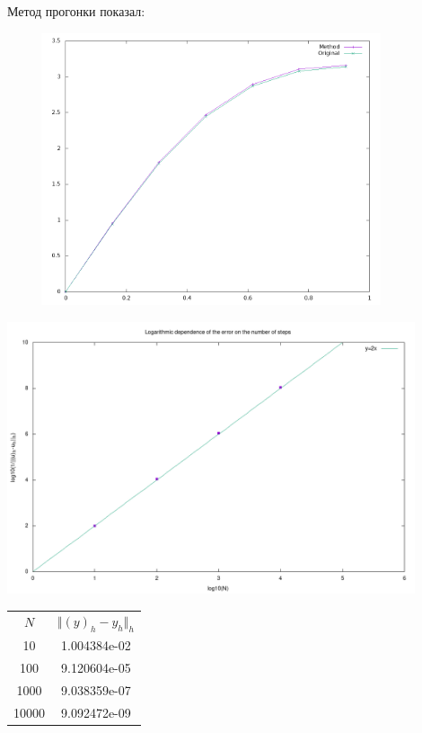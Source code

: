 \documentclass[12pt]{article}
\begin{document}
\begin{enumerate}[I.]
	      \newpage

	      Метод прогонки показал:
	      \begin{center}
		      \includegraphics[width=12cm, height=8cm]{tridiag_yn.png}

		      \includegraphics[width=12cm, height=8cm]{tridiag_scale.png}

		      \begin{tabular}{c c}
			      $N$   & $\Vert(y)_h-y_h\Vert_h$ \\
			      10    & 1.004384e-02            \\
			      100   & 9.120604e-05            \\
			      1000  & 9.038359e-07            \\
			      10000 & 9.092472e-09            \\
		      \end{tabular}
	      \end{center}

\end{enumerate}
\end{document}
